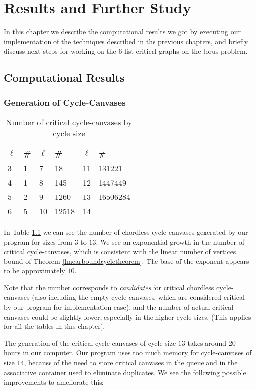 \chapter{Results and Further Study}

In this chapter we describe the computational results we got by executing our implementation
of the techniques described in the previous chapters, and briefly discuss next steps for
working on the 6-list-critical graphs on the torus problem.

\section{Computational Results}
\subsection{Generation of Cycle-Canvases}

\begin{table}[h]

\centering
\begin{tabular}{l | l || l | l || l | l}
$\ell$ & \# & $\ell$ & \# & $\ell$ & \# \\
\hline
3 & 1 & 7  & 18    & 11 & 131221\\ 
4 & 1 & 8  & 145   & 12 & 1447449 \\
5 & 2 & 9  & 1260  & 13 & 16506284 \\ 
6 & 5 & 10 & 12518 & 14 & -- 
\end{tabular}
\caption{Number of critical cycle-canvases by cycle size}
\label{tab:cyclecanvases}
\end{table}

In Table \ref{tab:cyclecanvases} we can see the number of chordless cycle-canvases generated by our program
for sizes from $3$ to $13$. 
We see an exponential growth in the number of critical cycle-canvases, which is consistent with the
linear number of vertices bound of Theorem \ref{linearboundcycletheorem}. 
The base of the exponent appears to be approximately $10$.

Note that the number corresponds to \emph{candidates} for critical chordless cycle-canvases (also including
the empty cycle-canvases, which are considered critical by our program for implementation ease), 
and the number of actual critical canvases could be slightly lower, especially in the higher cycle 
sizes. (This applies for all the tables in this chapter).

The generation of the critical cycle-canvases of cycle size $13$ takes around 20 hours in our 
computer. Our program uses too much memory for cycle-canvases of size $14$, because of the need to
store critical canvases in the queue and in the associative container used to eliminate duplicates.
We see the following possible improvements to ameliorate this:

